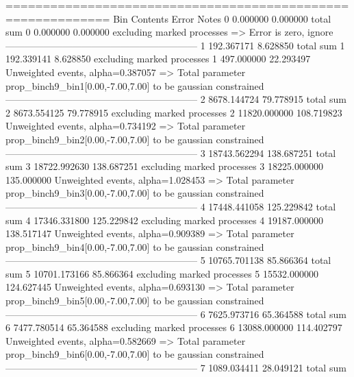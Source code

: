 ============================================================
Bin        Contents        Error           Notes                         
0          0.000000        0.000000        total sum                     
0          0.000000        0.000000        excluding marked processes    
  => Error is zero, ignore      
------------------------------------------------------------
1          192.367171      8.628850        total sum                     
1          192.339141      8.628850        excluding marked processes    
1          497.000000      22.293497       Unweighted events, alpha=0.387057
  => Total parameter prop_binch9_bin1[0.00,-7.00,7.00] to be gaussian constrained
------------------------------------------------------------
2          8678.144724     79.778915       total sum                     
2          8673.554125     79.778915       excluding marked processes    
2          11820.000000    108.719823      Unweighted events, alpha=0.734192
  => Total parameter prop_binch9_bin2[0.00,-7.00,7.00] to be gaussian constrained
------------------------------------------------------------
3          18743.562294    138.687251      total sum                     
3          18722.992630    138.687251      excluding marked processes    
3          18225.000000    135.000000      Unweighted events, alpha=1.028453
  => Total parameter prop_binch9_bin3[0.00,-7.00,7.00] to be gaussian constrained
------------------------------------------------------------
4          17448.441058    125.229842      total sum                     
4          17346.331800    125.229842      excluding marked processes    
4          19187.000000    138.517147      Unweighted events, alpha=0.909389
  => Total parameter prop_binch9_bin4[0.00,-7.00,7.00] to be gaussian constrained
------------------------------------------------------------
5          10765.701138    85.866364       total sum                     
5          10701.173166    85.866364       excluding marked processes    
5          15532.000000    124.627445      Unweighted events, alpha=0.693130
  => Total parameter prop_binch9_bin5[0.00,-7.00,7.00] to be gaussian constrained
------------------------------------------------------------
6          7625.973716     65.364588       total sum                     
6          7477.780514     65.364588       excluding marked processes    
6          13088.000000    114.402797      Unweighted events, alpha=0.582669
  => Total parameter prop_binch9_bin6[0.00,-7.00,7.00] to be gaussian constrained
------------------------------------------------------------
7          1089.034411     28.049121       total sum                     
